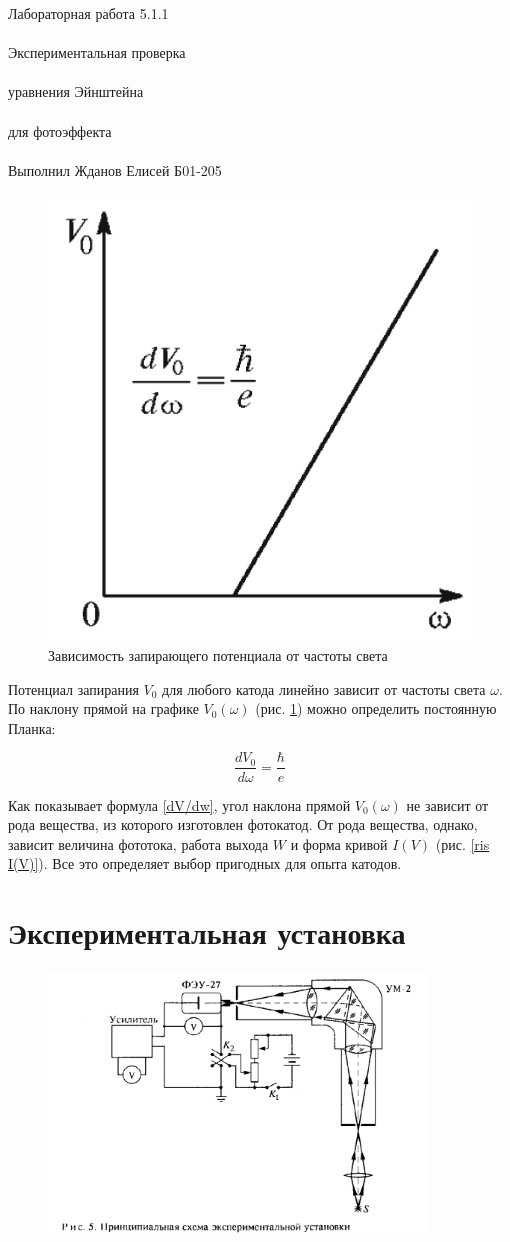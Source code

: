 \documentclass{astroedu-lab}
\begin{document}
\begin{problem}{\huge Лабораторная работа 5.1.1\\\\Экспериментальная проверка\\\\ уравнения Эйнштейна\\\\
для фотоэффекта\\\\Выполнил Жданов Елисей Б01-205}
	\begin{figure}[!h]
	\centering
	\includegraphics[width=0.3\linewidth]{V(w)}
	\caption{Зависимость запирающего потенциала
			от частоты света}
	\label{ris V(w)}
\end{figure}
	
	Потенциал запирания $ V_0 $ для любого катода линейно зависит от
	частоты света $ \omega $. По наклону прямой на графике $ V_0(\omega) $ (рис. \ref{ris V(w)}) можно определить постоянную Планка:
	
	\begin{equation}\label{dV/dw}
	\dfrac{dV_0}{d\omega} = \dfrac{\hbar}{e}
	\end{equation}
	
	Как показывает формула \eqref{dV/dw}, угол наклона прямой $ V_0(\omega) $ не зависит от рода вещества, из которого изготовлен фотокатод. От рода вещества, однако, зависит величина фототока, работа выхода $ W $ и форма кривой $ I(V) $ (рис. \ref{ris I(V)}). Все это определяет выбор пригодных для
	опыта катодов.

\section{Экспериментальная установка}

\begin{figure}[!h]
	\centering
	\includegraphics[width=0.9\textwidth]{2024-09-27_13-24-45.png}
	\label{fig:boiler}
\end{figure}


\end{problem}
\end{document}
